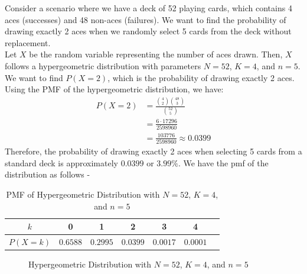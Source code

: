 \documentclass[openany]{book}
\begin{document}
\begin{example}
    Consider a scenario where we have a deck of 52 playing cards, which contains 4 aces (successes) and 48 non-aces (failures). We want to find the probability of drawing exactly 2 aces when we randomly select 5 cards from the deck without replacement. \\
    Let $X$ be the random variable representing the number of aces drawn. Then, $X$ follows a hypergeometric distribution with parameters $N = 52$, $K = 4$, and $n = 5$. We want to find $P(X = 2)$, which is the probability of drawing exactly 2 aces. Using the PMF of the hypergeometric distribution, we have:
    \begin{align*}
        P(X = 2) &= \frac{\binom{4}{2} \binom{48}{3}}{\binom{52}{5}} \\
        &= \frac{6 \cdot 17296}{2598960} \\
        &= \frac{103776}{2598960} \approx 0.0399
    \end{align*}
    Therefore, the probability of drawing exactly 2 aces when selecting 5 cards from a standard deck is approximately $0.0399$ or $3.99\%$.
    We have the pmf of the distribution as follows -
    \begin{table}[H]
        \centering
        \begin{tabular}{c|cccccc}
            $k$ & 0 & 1 & 2 & 3 & 4 \\
            \hline
            $P(X = k)$ & $0.6588$ & $0.2995$ & $0.0399$ & $0.0017$ & $0.0001$ \\
        \end{tabular}
        \caption{PMF of Hypergeometric Distribution with $N = 52$, $K = 4$, and $n = 5$}
    \end{table}
    \begin{figure}[H]
        \centering
        \caption{Hypergeometric Distribution with $N = 52$, $K = 4$, and $n = 5$}
    \end{figure}
\end{example}
\end{document}
